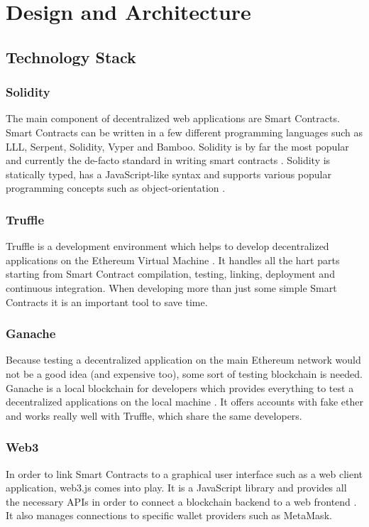 \chapter{Design and Architecture}

\label{cha:DesignArchitecture}

\section{Technology Stack}
\subsection{Solidity}
The main component of decentralized web applications are Smart Contracts. Smart Contracts can be written in a few different programming languages such as LLL, Serpent, Solidity, Vyper and Bamboo. Solidity is by far the most popular and currently the de-facto standard in writing smart contracts \cite{AntonopoulosWood2018}. Solidity is statically typed, has a JavaScript-like syntax and supports various popular programming concepts such as object-orientation \cite{SolidityDocumentation}\cite{Solidity}.

\subsection{Truffle}
Truffle is a development environment which helps to develop decentralized applications on the Ethereum Virtual Machine \cite{Truffle}. It handles all the hart parts starting from Smart Contract compilation, testing, linking, deployment and continuous integration. When developing more than just some simple Smart Contracts it is an important tool to save time.

\subsection{Ganache}
Because testing a decentralized application on the main Ethereum network would not be a good idea (and expensive too), some sort of testing blockchain is needed. Ganache is a local blockchain for developers which provides everything to test a decentralized applications on the local machine \cite{Ganache}. It offers accounts with fake ether and works really well with Truffle, which share the same developers.

\subsection{Web3}
In order to link Smart Contracts to a graphical user interface such as a web client application, web3.js comes into play. It is a JavaScript library and provides all the necessary APIs in order to connect a blockchain backend to a web frontend \cite{Web3}. It also manages connections to specific wallet providers such as MetaMask.

